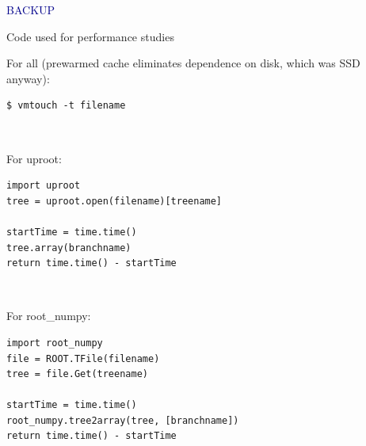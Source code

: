 \documentclass[aspectratio=169]{beamer}
\begin{document}
\begin{frame}{}
\begin{center}
\Huge \textcolor{darkblue}{BACKUP}
\end{center}
\end{frame}

\begin{frame}[fragile]{Code used for performance studies}
\vspace{0.5 cm}
\scriptsize

{\normalsize For all (prewarmed cache eliminates dependence on disk, which was SSD anyway):}

\begin{verbatim}
$ vmtouch -t filename
\end{verbatim}

\vspace{0.5 cm}
\mbox{ } \hfill \begin{minipage}{0.5\linewidth}
{\normalsize For uproot:}

\begin{verbatim}
import uproot
tree = uproot.open(filename)[treename]

startTime = time.time()
tree.array(branchname)
return time.time() - startTime
\end{verbatim}
\end{minipage} \hfill \mbox{ }

\vspace{0.5 cm}
\hfill \begin{minipage}{0.5\linewidth}
{\normalsize For root\_numpy:}

\begin{verbatim}
import root_numpy
file = ROOT.TFile(filename)
tree = file.Get(treename)

startTime = time.time()
root_numpy.tree2array(tree, [branchname])
return time.time() - startTime
\end{verbatim}
\end{minipage}
\end{frame}
\end{document}
